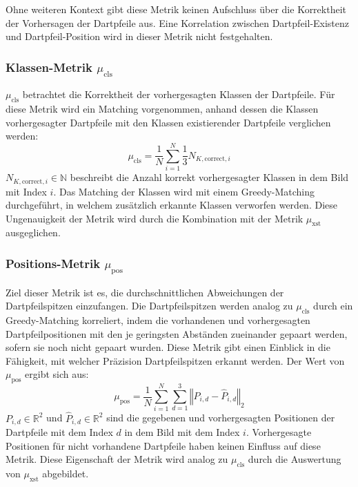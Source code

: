 Ohne weiteren Kontext gibt diese Metrik keinen Aufschluss über die Korrektheit der Vorhersagen der Dartpfeile aus. Eine Korrelation zwischen Dartpfeil-Existenz und Dartpfeil-Position wird in dieser Metrik nicht festgehalten.

\subsubsection{Klassen-Metrik $\mu_\text{cls}$}

$\mu_\text{cls}$ betrachtet die Korrektheit der vorhergesagten Klassen der Dartpfeile. Für diese Metrik wird ein Matching vorgenommen, anhand dessen die Klassen vorhergesagter Dartpfeile mit den Klassen existierender Dartpfeile verglichen werden:
\begin{equation*}
    \mu_\text{cls} = \frac{1}{N}\sum_{i=1}^{N} \frac{1}{3} N_{K, \text{correct}, i}
\end{equation*}
$N_{K, \text{correct}, i} \in \mathbb{N}$ beschreibt die Anzahl korrekt vorhergesagter Klassen in dem Bild mit Index $i$. Das Matching der Klassen wird mit einem Greedy-Matching durchgeführt, in welchem zusätzlich erkannte Klassen verworfen werden. Diese Ungenauigkeit der Metrik wird durch die Kombination mit der Metrik $\mu_\text{xst}$ ausgeglichen.

\subsubsection{Positions-Metrik $\mu_\text{pos}$}

Ziel dieser Metrik ist es, die durchschnittlichen Abweichungen der Dartpfeilspitzen einzufangen. Die Dartpfeilspitzen werden analog zu $\mu_\text{cls}$ durch ein Greedy-Matching korreliert, indem die vorhandenen und vorhergesagten Dartpfeilpositionen mit den je geringsten Abständen zueinander gepaart werden, sofern sie noch nicht gepaart wurden. Diese Metrik gibt einen Einblick in die Fähigkeit, mit welcher Präzision Dartpfeilspitzen erkannt werden. Der Wert von $\mu_\text{pos}$ ergibt sich aus:
\begin{equation*}
    \mu_\text{pos} = \frac{1}{N} \sum_{i=1}^{N} \sum_{d=1}^{3} \left\Vert P_{i, d} - \widehat{P}_{i, d} \right\Vert _2
\end{equation*}
$P_{i, d} \in \mathbb{R}^2$ und $\widehat{P}_{i, d} \in \mathbb{R}^2$ sind die gegebenen und vorhergesagten Positionen der Dartpfeile mit dem Index $d$ in dem Bild mit dem Index $i$. Vorhergesagte Positionen für nicht vorhandene Dartpfeile haben keinen Einfluss auf diese Metrik. Diese Eigenschaft der Metrik wird analog zu $\mu_\text{cls}$ durch die Auswertung von $\mu_\text{xst}$ abgebildet.


